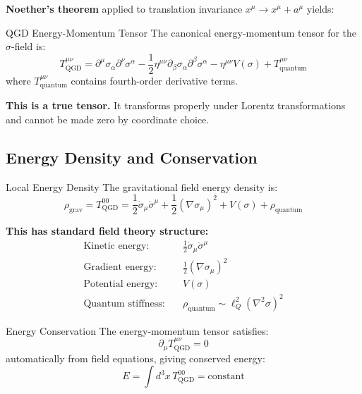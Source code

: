 \documentclass[11pt,a4paper]{article}
\theoremstyle{definition}
\theoremstyle{remark}
\begin{document}
	\textbf{Noether's theorem} applied to translation invariance $x^\mu \to x^\mu + a^\mu$ yields:
	
	QGD Energy-Momentum Tensor
		The canonical energy-momentum tensor for the $\sigma$-field is:
		\begin{equation}\label{eq:T_sigma}
			\boxed{T^{\mu\nu}_{\text{QGD}} = \partial^\mu\sigma_\alpha\partial^\nu\sigma^\alpha - \frac{1}{2}\eta^{\mu\nu}\partial_\beta\sigma_\alpha\partial^\beta\sigma^\alpha - \eta^{\mu\nu}V(\sigma) + T^{\mu\nu}_{\text{quantum}}}
		\end{equation}
		where $T^{\mu\nu}_{\text{quantum}}$ contains fourth-order derivative terms.

	
	\textbf{This is a true tensor.} It transforms properly under Lorentz transformations and cannot be made zero by coordinate choice.
	
	\subsection{Energy Density and Conservation}
	
	Local Energy Density
		The gravitational field energy density is:
		\begin{equation}
			\boxed{\rho_{\text{grav}} = T^{00}_{\text{QGD}} = \frac{1}{2}\dot{\sigma}_\mu\dot{\sigma}^\mu + \frac{1}{2}(\nabla\sigma_\mu)^2 + V(\sigma) + \rho_{\text{quantum}}}
		\end{equation}
	
	\textbf{This has standard field theory structure:}
	\begin{align}
		\text{Kinetic energy:} &\quad \frac{1}{2}\dot{\sigma}_\mu\dot{\sigma}^\mu\\
		\text{Gradient energy:} &\quad \frac{1}{2}(\nabla\sigma_\mu)^2\\
		\text{Potential energy:} &\quad V(\sigma)\\
		\text{Quantum stiffness:} &\quad \rho_{\text{quantum}} \sim \ell_Q^2(\nabla^2\sigma)^2
	\end{align}
	
	Energy Conservation
		The energy-momentum tensor satisfies:
		\begin{equation}
			\partial_\mu T^{\mu\nu}_{\text{QGD}} = 0
		\end{equation}
		automatically from field equations, giving conserved energy:
		\begin{equation}
			E = \int d^3x\,T^{00}_{\text{QGD}} = \text{constant}
		\end{equation}
	
\end{document}
